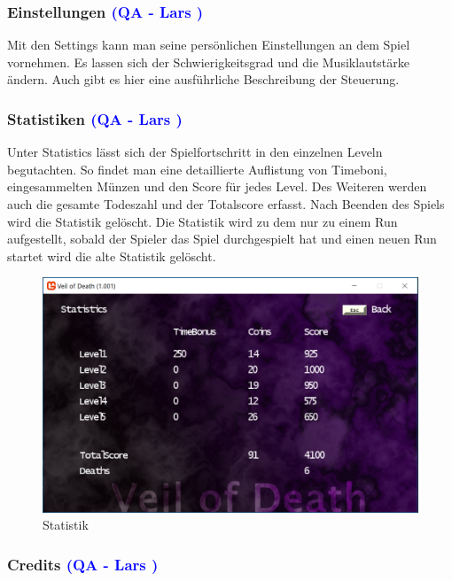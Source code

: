 \documentclass[12pt]{article}
\begin{document}
\vspace{1cm}
\subsubsection{Einstellungen \textcolor{blue}{(QA - Lars )}}

Mit den Settings kann man seine persönlichen Einstellungen an dem Spiel vornehmen. Es lassen sich der Schwierigkeitsgrad und die Musiklautstärke
ändern. Auch gibt es hier eine ausführliche Beschreibung der Steuerung.

\vspace{1cm}
\subsubsection{Statistiken \textcolor{blue}{(QA - Lars )}}

Unter Statistics lässt sich der Spielfortschritt in den einzelnen Leveln begutachten. So findet man eine detaillierte Auflistung von Timeboni, eingesammelten
Münzen und den Score für jedes Level. Des Weiteren werden auch die gesamte Todeszahl und der Totalscore erfasst. Nach Beenden des Spiels wird
die Statistik gelöscht. Die Statistik wird zu dem  nur zu einem Run aufgestellt, sobald der Spieler das Spiel durchgespielt hat und einen neuen Run startet
wird die alte Statistik gelöscht.

\begin{figure}
	\centering
	\includegraphics[width=1\textwidth]{Statistics}
	\caption{Statistik
		\label{fig:statistics}}
\end{figure}

\vspace{1cm}
\subsubsection{Credits \textcolor{blue}{(QA - Lars )}}
\end{document}
